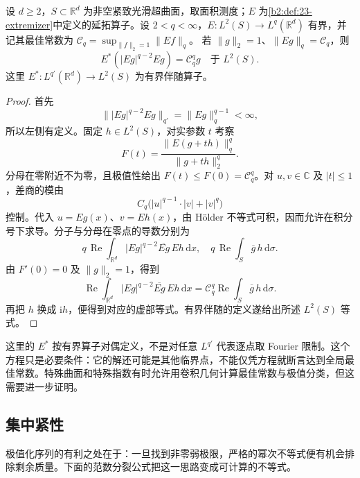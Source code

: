 \begin{proposition}\label{b2:prop:23-extremizer-euler}
设 \(d\geq2\)，\(S\subset\mathbb R^d\) 为非空紧致光滑超曲面，取面积测度；\(E\) 为\cref{b2:def:23-extremizer}中定义的延拓算子。设 \(2<q<\infty\)，\(E:L^2(S)\to L^q(\mathbb R^d)\) 有界，并记其最佳常数为
\(\mathcal C_q=\sup_{\|f\|_2=1}\|Ef\|_q\)。
若 \(\|g\|_2=1\)、\(\|Eg\|_q=\mathcal C_q\)，则
\[
 E^*(|Eg|^{q-2}Eg)=\mathcal C_q^q g
 \quad\text{于 }L^2(S).
\]
这里 \(E^*:L^{q'}(\mathbb R^d)\to L^2(S)\) 为有界伴随算子。
\end{proposition}
\begin{proof}
首先
\[
 \bigl\||Eg|^{q-2}Eg\bigr\|_{q'}
 =\|Eg\|_q^{q-1}<\infty,
\]
所以左侧有定义。固定 \(h\in L^2(S)\)，对实参数 \(t\) 考察
\[
 F(t)=\frac{\|E(g+th)\|_q^q}{\|g+th\|_2^q}.
\]
分母在零附近不为零，且极值性给出 \(F(t)\leq F(0)=\mathcal C_q^q\)。对 \(u,v\in\mathbb C\) 及 \(|t|\leq1\)，差商的模由
\[
 C_q\bigl(|u|^{q-1}\cdot|v|+|v|^q\bigr)
\]
控制。代入 \(u=Eg(x)\)、\(v=Eh(x)\)，由 Hölder 不等式可积，因而允许在积分号下求导。分子与分母在零点的导数分别为
\[
 q\,\operatorname{Re}\int_{\mathbb R^d}
       |Eg|^{q-2}\overline{Eg}\,Eh\,\mathrm dx,\quad
 q\,\operatorname{Re}\int_S\overline g\,h\,\mathrm d\sigma.
\]
由 \(F'(0)=0\) 及 \(\|g\|_2=1\)，得到
\[
 \operatorname{Re}\int_{\mathbb R^d}
       |Eg|^{q-2}\overline{Eg}\,Eh\,\mathrm dx
 =\mathcal C_q^q\operatorname{Re}
       \int_S\overline g\,h\,\mathrm d\sigma.
\]
再把 \(h\) 换成 \(\mathrm i h\)，便得到对应的虚部等式。有界伴随的定义遂给出所述 \(L^2(S)\) 等式。
\end{proof}

这里的 \(E^*\) 按有界算子对偶定义，不是对任意 \(L^{q'}\) 代表逐点取 Fourier 限制。这个方程只是必要条件：它的解还可能是其他临界点，不能仅凭方程就断言达到全局最佳常数。特殊曲面和特殊指数有时允许用卷积几何计算最佳常数与极值分类，但这需要进一步证明。

\subsection{集中紧性}
\label{b2:subsec:230505}

极值化序列的有利之处在于：一旦找到非零弱极限，严格的幂次不等式便有机会排除剩余质量。下面的范数分裂公式把这一思路变成可计算的不等式。

